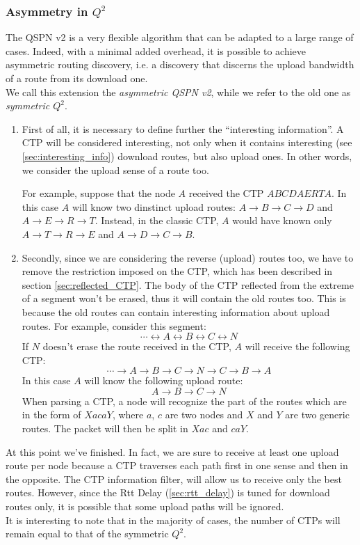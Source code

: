 \documentclass[a4paper]{article}
\begin{document}
\subsubsection{Asymmetry in $Q^2$}
The QSPN v2 is a very flexible algorithm that can be adapted to a large range
of cases. Indeed, with a minimal added overhead, it is possible to achieve
asymmetric routing discovery, i.e. a discovery that discerns the upload
bandwidth of a route from its download one.\\
We call this extension the \emph{asymmetric QSPN v2}, while we refer to the
old one as \emph{symmetric $Q^2$}.

\begin{enumerate}
	\item	First of all, it is necessary to define further the ``interesting
		information''. A CTP will be considered interesting, not only when it contains
		interesting (see \ref{sec:interesting_info}) download routes, but also upload
		ones. In other words, we consider the upload sense of a route too. 

		For example, suppose that the node $A$ received the CTP $ABCDAERTA$. In this
		case $A$ will know two dinstinct upload routes: $A\rightarrow B\rightarrow
		C\rightarrow D$ and $A\rightarrow E\rightarrow R\rightarrow T$. Instead, in
		the classic CTP, $A$ would have known only $A\rightarrow T\rightarrow
		R\rightarrow E$ and $A\rightarrow D\rightarrow C\rightarrow B$.
	\item Secondly, since we are considering the reverse (upload) routes
		too, we have to remove the restriction imposed on the CTP,
		which has been described in section \ref{sec:reflected_CTP}.
                The body of the CTP reflected from the extreme of a segment
                won't be erased, thus it will contain the old routes too.
		This is because the old routes can contain interesting
		information about upload routes.
		For example, consider this segment:
		\[ \cdots \leftrightarrow A \leftrightarrow B \leftrightarrow C \leftrightarrow N \]
		If $N$ doesn't erase the route received in the CTP, $A$ will
		receive the following CTP:
		\[
		\cdots \rightarrow A \rightarrow B \rightarrow C \rightarrow N \rightarrow C \rightarrow B \rightarrow A
		\]
		In this case $A$ will know the following upload route:
		\[
			A \rightarrow B \rightarrow C \rightarrow N
		\]
		When parsing a CTP, a node will recognize the part of the
		routes which are in the form of $XacaY$, where $a$, $c$ are
		two nodes and $X$ and $Y$ are two generic routes. The packet
		will then be split in $Xac$ and $caY$.
\end{enumerate}
At this point we've finished. In fact, we are sure to receive at least one
upload route per node because a CTP traverses each path first in one sense
and then in the opposite. The CTP information filter, will allow us
to receive only the best routes. However, since the Rtt Delay
(\ref{sec:rtt_delay}) is tuned for download routes only, it is possible that
some upload paths will be ignored.\\
It is interesting to note that in the majority of cases, the number of
CTPs will remain equal to that of the symmetric $Q^2$.
\end{document}
